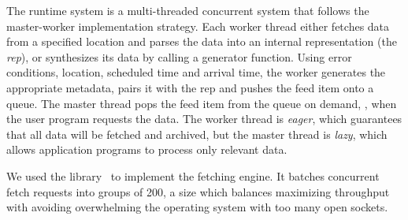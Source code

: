 The \padsd{} runtime system is a multi-threaded concurrent
system that follows the  master-worker implementation strategy. 
Each worker thread either fetches data from a specified
location and parses the data into an internal representation (the {\em rep}),
or synthesizes its data by calling a
generator function.  Using error conditions, location, scheduled time
and arrival time, the worker generates the appropriate metadata,
pairs it with the rep and pushes the feed item onto a queue. 
The master thread pops the feed item from the queue on demand, \ie{},
when the user program requests the data. 
The worker thread is {\em eager}, which guarantees that all 
data will be fetched and archived, but the master thread is 
{\em lazy}, which allows application programs to process only relevant
data. 


We used the \ocamlnet{} library~\cite{ocamlnet2} to implement
the fetching engine. It batches concurrent fetch requests into groups
of 200, a size which balances maximizing throughput with avoiding
overwhelming the operating system with too many open sockets.




 
